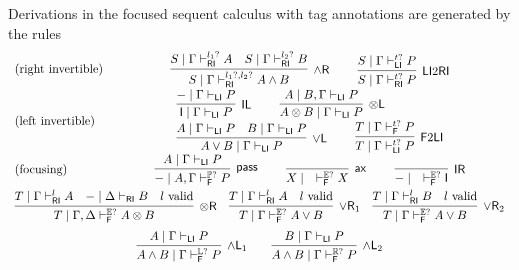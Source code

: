 \documentclass[submission,copyright,creativecommons]{eptcs}
\theoremstyle{definition}
\newcommand{\tl}{\otimes \mathsf{L}}
\newcommand{\tr}{\otimes \mathsf{R}}
\newcommand{\pass}{\mathsf{pass}}
\newcommand{\unitl}{\mathsf{IL}}
\newcommand{\unitr}{\mathsf{IR}}
\newcommand{\andlone}{\land \mathsf{L}_{1}}
\newcommand{\andltwo}{\land \mathsf{L}_{2}}
\newcommand{\andr}{\land \mathsf{R}}
\newcommand{\orl}{\lor \mathsf{L}}
\newcommand{\orrone}{\lor \mathsf{R}_{1}}
\newcommand{\orrtwo}{\lor \mathsf{R}_{2}}
\newcommand{\ax}{\mathsf{ax}}
\newcommand{\ot}{\otimes}
\newcommand{\I}{\mathsf{I}}
\newcommand{\RI}{\mathsf{RI}}
\newcommand{\LI}{\mathsf{LI}}
\newcommand{\F}{\mathsf{F}}
\newcommand{\tP}{\mathbb{P}}
\newcommand{\tL}{\mathbb{L}}
\newcommand{\tR}{\mathbb{R}}
\newcommand{\tE}{\mathbb{E}}
\newcommand{\proofbox}[1]{\begin{tabular}{l} #1 \end{tabular}}
\begin{document}
Derivations in the focused sequent calculus with tag annotations are generated by the rules
\begin{equation}\label{eq:focus}
  \begin{array}{lc}
    \text{(right invertible)} & %
    \proofbox{
      \infer[\andr]{S \mid \Gamma \vdash^{l_1?, l_2?}_{\RI} A \land B}{
        S \mid \Gamma \vdash^{l_1?}_{\RI} A
        &
        S \mid \Gamma \vdash^{l_2?}_{\RI} B
      }
    \qquad
    \infer[\LI 2 \RI]{S \mid \Gamma \vdash^{t?}_{\RI} P}{S \mid \Gamma \vdash^{t?}_{\LI} P}
    }
    \\[10pt]
    \text{(left invertible)} & %
    \proofbox{
      \infer[\unitl]{\I \mid \Gamma \vdash_{\LI} P}{{-} \mid \Gamma \vdash_{\LI} P}
    \qquad
    \infer[\tl]{A \ot B \mid \Gamma \vdash_{\LI} P}{A \mid B , \Gamma \vdash_{\LI} P}
    \\
    \infer[\orl]{A \lor B \mid \Gamma \vdash_\LI P}{
      A \mid \Gamma \vdash_\LI P
      &
      B \mid \Gamma \vdash_\LI P
    }
    \qquad
    \infer[\F 2 \LI]{T \mid \Gamma \vdash^{t?}_{\LI} P}{T \mid \Gamma \vdash^{t?}_{\F} P}
    }
    \\[10pt]
    \text{(focusing)} &    %
    \proofbox{
    \infer[\pass]{{-} \mid A , \Gamma \vdash^{\tP?}_{\F} P }{
        A \mid \Gamma \vdash_{\LI} P
    }
    \qquad
    \infer[\ax]{X \mid \quad \vdash^{\tE?}_{\F} X}{}
    \qquad
    \infer[\unitr]{{-} \mid \quad \vdash^{\tE?}_{\F} \I}{}
    }
    \\[10pt]
    \multicolumn{2}{c}{
    \infer[\tr]{T \mid \Gamma , \Delta \vdash^{\tE?}_{\F} A \ot B}{
      T \mid \Gamma \vdash^{l}_{\RI} A
      &
      {-} \mid \Delta \vdash_{\RI} B
      &
      l \ \text{valid}
    }
    \quad
    \infer[\orrone]{T \mid \Gamma \vdash^{\tE?}_{\F} A \lor B}{
      T \mid \Gamma \vdash^{l}_{\RI} A
      &
      l \ \text{valid}
    }
    \quad
    \infer[\orrtwo]{T \mid \Gamma \vdash^{\tE?}_{\F} A \lor B}{
      T \mid \Gamma \vdash^{l}_{\RI} B
      &
      l \ \text{valid}
    }
    }
    \\[6pt]
    \multicolumn{2}{c}{
    \infer[\andlone]{A \land B \mid \Gamma \vdash^{\tL?}_{\F} P}{A \mid \Gamma \vdash_{\LI} P}
    \qquad
    \infer[\andltwo]{A \land B \mid \Gamma \vdash^{\tR?}_{\F} P}{B \mid \Gamma \vdash_{\LI} P}
    }
  \end{array}
\end{equation}
\end{document}
